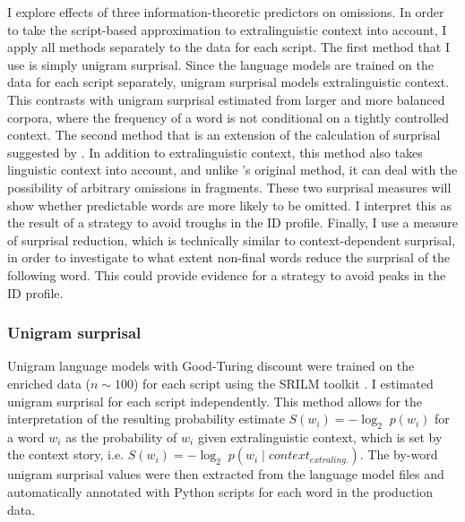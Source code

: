 I explore effects of three information-theoretic predictors on omissions. In order to take the script-based approximation to extralinguistic context into account, I apply all methods separately to the data for each script. The first method that I use is simply unigram surprisal. Since the language models are trained on the data for each script separately, unigram surprisal models extralinguistic context. This contrasts with unigram surprisal estimated from larger and more balanced corpora, where the frequency of a word is not conditional on a tightly controlled context. The second method that is an extension of the calculation of surprisal suggested by \citet{hale2001}. In addition to extralinguistic context, this method also takes linguistic context into account, and unlike \citeauthor{hale2001}'s original method, it can deal with the possibility of arbitrary omissions in fragments. These two surprisal measures will show whether predictable words are more likely to be omitted. I interpret this as the result of a strategy to avoid troughs in the ID profile. Finally, I use a measure of surprisal reduction, which is technically similar to context-dependent surprisal, in order to investigate to what extent non-final words reduce the surprisal of the following word. This could provide evidence for a strategy to avoid peaks in the ID profile.

\subsubsection{Unigram surprisal}

Unigram language models with Good-Turing discount were trained on the enriched data ($n \sim 100$) for each script using the SRILM toolkit \citep{stolcke2002}. I estimated unigram surprisal for each script independently. This method allows for the interpretation of the resulting probability estimate $S(w_i) = -\log_2\;p(w_i)$ for a word $w_i$ as the probability of $w_i$  given extralinguistic context, which is set by the context story, i.e. $S(w_i) = -\log_2\;p(w_i\mathbin{|} context_{extraling.})$. The by-word unigram surprisal values were then extracted from the language model files and automatically annotated with Python scripts for each word in the production data. 

